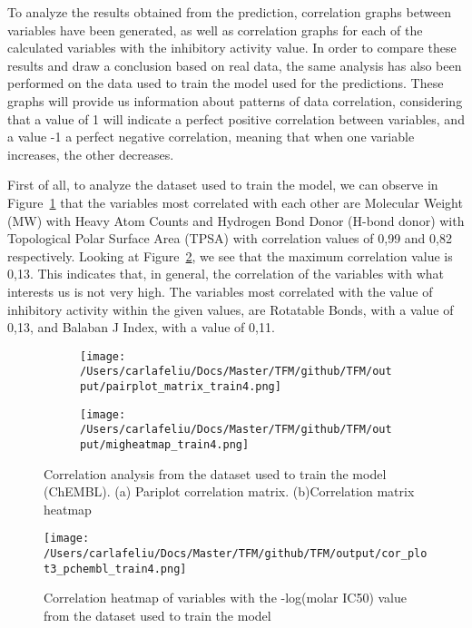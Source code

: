\documentclass[final,times,twocolumn,article]{elsarticle}
\begin{document}
 To analyze the results obtained from the prediction, correlation graphs between variables have been generated, as well as correlation graphs for each of the calculated variables with the inhibitory activity value. In order to compare these results and draw a conclusion based on real data, the same analysis has also been performed on the data used to train the model used for the predictions. These graphs will provide us information about patterns of data correlation, considering that a value of 1 will indicate a perfect positive correlation between variables, and a value -1 a perfect negative correlation, meaning that when one variable increases, the other decreases. 



 First of all, to analyze the dataset used to train the model, we can observe in Figure~\ref{Figure6} that the variables most correlated with each other are Molecular Weight (MW) with Heavy Atom Counts and Hydrogen Bond Donor (H-bond donor) with Topological Polar Surface Area (TPSA) with correlation values of 0,99 and 0,82 respectively. Looking at Figure~\ref{Figure7}, we see that the maximum correlation value is 0,13. This indicates that, in general, the correlation of the variables with what interests us is not very high. The variables most correlated with the value of inhibitory activity within the given values, are Rotatable Bonds, with a value of 0,13, and Balaban J Index, with a value of 0,11. 

\begin{figure}[h]
    \begin{subfigure}{0.5\textwidth}
        \texttt{[image: /Users/carlafeliu/Docs/Master/TFM/github/TFM/output/pairplot\_matrix\_train4.png]} 
        \caption{}%
    \end{subfigure}
    \hfill
    \begin{subfigure}{0.5\textwidth}
        \texttt{[image: /Users/carlafeliu/Docs/Master/TFM/github/TFM/output/migheatmap\_train4.png]}
        \caption{} %
    \end{subfigure}
    
    \caption{Correlation analysis from the dataset used to train the model (ChEMBL). (a) Pariplot correlation matrix. (b)Correlation matrix heatmap}
    \label{Figure6}
\end{figure}

\begin{figure}[h]
    \centering 
     \texttt{[image: /Users/carlafeliu/Docs/Master/TFM/github/TFM/output/cor\_plot3\_pchembl\_train4.png]}	
     \caption{Correlation heatmap of variables with the -log(molar IC50) value from the dataset used to train the model} 
     \label{Figure7}
 \end{figure}
\end{document}
